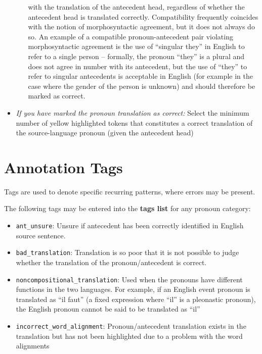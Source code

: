 \documentclass[11pt]{article} %
\newcommand\tag[1]{\texttt{#1}}
\begin{document}
\begin{itemize}
\begin{itemize}
	    with the translation of the antecedent head, regardless of whether
	    the antecedent head is translated correctly. Compatibility
	    frequently coincides with the notion of morphosyntactic agreement,
	    but it does not always do so. An example of a compatible
	    pronoun-antecedent pair violating morphosyntactic agreement is the
	    use of ``singular they'' in English to refer to a single person --
	    formally, the pronoun ``they'' is a plural and does not agree in
	    number with its antecedent, but the use of ``they'' to refer to
	    singular antecedents is acceptable in English (for example in the
	    case where the gender of the person is unknown) and should
	    therefore be marked as correct.
  \end{itemize}
  \item \textit{If you have marked the pronoun translation as correct:} Select the minimum number of yellow highlighted tokens that constitutes a correct translation of the source-language pronoun (given the antecedent head)
\end{itemize}


\section{Annotation Tags}
\label{Tags}
Tags are used to denote specific recurring patterns, where errors may be present.

The following tags may be entered into the \textbf{tags list} for any pronoun category:

\begin{itemize}
  \item \tag{ant\_unsure}: Unsure if antecedent has been correctly identified in English source sentence.
  \item \tag{bad\_translation}: Translation is so poor that it is not possible to judge whether the translation of the pronoun/antecedent is correct.
  \item \tag{noncompositional\_translation}: Used when the pronouns have different functions in the two languages. For example, if an English event pronoun is translated as ``il faut'' (a fixed expression where ``il'' is a pleonastic pronoun), the English pronoun cannot be said to be translated as ``il''
  \item \tag{incorrect\_word\_alignment}: Pronoun/antecedent translation exists in the translation but has not been highlighted due to a problem with the word alignments
\end{itemize}  
\end{document}
